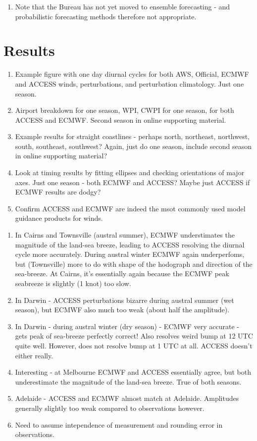 \documentclass[alpha-refs]{wiley-article}
\begin{document}
\begin{enumerate}
\item
Note that the Bureau has not yet moved to ensemble forecasting - and probabilistic forecasting methods therefore not appropriate. 
\end{enumerate}

\section{Results}
\label{results}

\begin{enumerate}
\item
Example figure with one day diurnal cycles for both AWS, Official, ECMWF and ACCESS winds, perturbations, and perturbation climatology. Just one season.
\item
Airport breakdown for one season, WPI, CWPI for one season, for both ACCESS and ECMWF. Second season in online supporting material.
\item
Example results for straight coastlines - perhaps north, northeast, northwest, south, southeast, southwest? Again, just do one season, include second season in online supporting material?
\item
Look at timing results by fitting ellipses and checking orientations of major axes. Just one season - both ECMWF and ACCESS? Maybe just ACCESS if ECMWF results are dodgy?
\item
Confirm ACCESS and ECMWF are indeed the msot commonly used model guidance products for winds. 
\end{enumerate}

\begin{enumerate}
\item
In Cairns and Townsville (austral summer), ECMWF understimates the magnitude of the land-sea breeze, leading to ACCESS resolving the diurnal cycle more accurately. During austral winter ECMWF again underperfoms, but (Townsville) more to do with shape of the hodograph and direction of the sea-breeze. At Cairns, it's essentially again because the ECMWF peak seabreeze is slightly (1 knot) too slow.   
\item
In Darwin - ACCESS perturbations bizarre during austral summer (wet season), but ECMWF also much too weak (about half the amplitude). 
\item
In Darwin - during austral winter (dry season) - ECMWF very accurate - gets peak of sea-breeze perfectly correct! Also resolves weird bump at 12 UTC quite well. However, does not resolve bump at 1 UTC at all. ACCESS doesn't either really. 
\item
Interesting - at Melbourne ECMWF and ACCESS essentially agree, but both underestimate the magnitude of the land-sea breeze. True of both seasons. 
\item
Adelaide - ACCESS and ECMWF almost match at Adelaide. Amplitudes generally slightly too weak compared to observations however. 
\item
Need to assume intependence of measurement and rounding error in observations. 
\end{enumerate}
\end{document}
